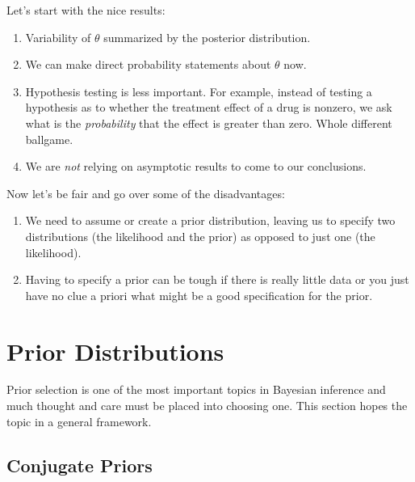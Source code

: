 \documentclass[a4paper,12pt]{scrartcl}
\begin{document}
Let's start with the nice results:
\begin{enumerate}
   \item{Variability of $\theta$ summarized by the posterior 
      distribution.}
   \item{We can make direct probability statements about $\theta$ now.}
   \item{Hypothesis testing is less important.  For example, instead
      of testing a hypothesis as to whether the treatment effect of a 
      drug is nonzero, we ask what is the \emph{probability} that
      the effect is greater than zero. Whole different ballgame.}
   \item{We are \emph{not} relying on asymptotic results to come
      to our conclusions.}
\end{enumerate}
Now let's be fair and go over some of the disadvantages:
\begin{enumerate}
   \item{We need to assume or create a prior distribution, leaving
      us to specify two distributions (the likelihood and the 
      prior) as opposed to just one (the likelihood).
   }
   \item{Having to specify a prior can be tough if there is really
      little data or you just have no clue a priori what might
      be a good specification for the prior.}
\end{enumerate}

\newpage

\section{Prior Distributions}

Prior selection is one of the most important topics in Bayesian inference
and much thought and care must be placed into choosing one. This section
hopes the topic in a general framework.


\subsection{Conjugate Priors}
\end{document}
